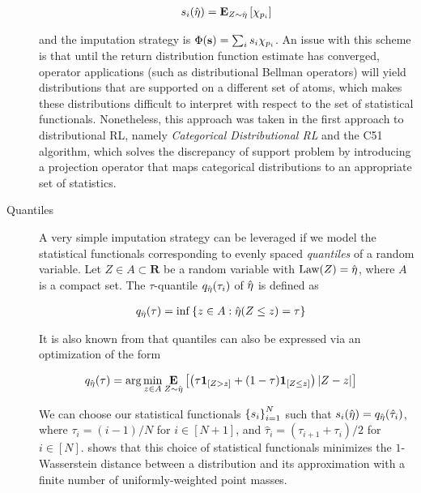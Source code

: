 \begin{description}
    \begin{align*}
      s_i(\hat\returnmeasure) = \expectation{Z\sim\hat\returnmeasure}{\characteristic{p_i}}
    \end{align*}

    and the imputation strategy is $\Phi(\mathbf{s}) =
    \sum_is_i\characteristic{p_i}$. An issue with this scheme is that until the
    return distribution function estimate has converged, operator applications (such
    as distributional Bellman operators) will yield distributions that are supported
    on a different set of atoms, which makes these distributions difficult to
    interpret with respect to the set of statistical functionals. Nonetheless,
    this approach was taken in the first
    approach to distributional RL, namely \emph{Categorical Distributional RL}
    \citep{Bellemare2017ADP} and the C51 algorithm, which solves the discrepancy of
    support problem by introducing a projection operator that maps categorical
    distributions to an appropriate set of statistics.

  \item[Quantiles]
    A very simple imputation strategy can be leveraged if we model the
    statistical functionals corresponding to evenly spaced
    \emph{quantiles} of a random variable. Let $Z\in A\subset\mathbf{R}$ be a
    random variable with $\text{Law}(Z) = \hat\returnmeasure$, where $A$
    is a compact set. The
    $\tau$-quantile $\quantile{\hat\returnmeasure}(\tau_i)$ of $\hat\returnmeasure$ is defined as 

    \begin{align*}
      \quantile{\hat\returnmeasure}(\tau) &= \inf\left\{z\in A :
        \hat\returnmeasure(Z\leq z) =
      \tau\right\} 
      \end{align*}

      It is also known from \citet{koenker1978regression,
      Dabney2018DistributionalRL} that quantiles can also be expressed via
      an optimization of the form

      \begin{align*}
        \quantile{\hat\returnmeasure}(\tau) &=
        \arg\min_{z\in A}\Expectation{Z\sim\hat\returnmeasure}{\left(\tau\indicator{Z>z}
        + (1-\tau)\indicator{Z\leq z}\right)|Z - z|}
      \end{align*}

      We can choose our statistical functionals $\indexedint{i}{N}{s}$ such
      that $s_i(\hat\returnmeasure) =
      \quantile{\hat\returnmeasure}(\hat\tau_i)$, where $\tau_i = (i-1)/N$
      for $i\in [N+1]$, and $\hat\tau_i = (\tau_{i+1} + \tau_i)/2$ for
      $i\in[N]$. \citet{Dabney2018DistributionalRL} shows that this choice of
      statistical functionals minimizes the $1$-Wasserstein distance between a
      distribution and its approximation with a finite number of
      uniformly-weighted point masses.
\end{description}

